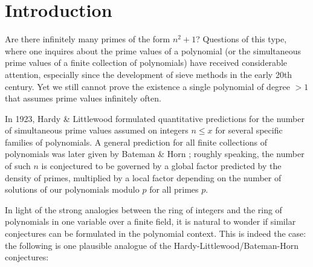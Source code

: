 \documentclass[a4paper]{compositio}
\begin{document}
\section{Introduction}

Are there infinitely many primes of the form $n^2+1$? Questions of
this type, where one inquires about the prime values of a polynomial
(or the simultaneous prime values of a finite collection of
polynomials) have received considerable attention, especially since
the development of sieve methods in the early 20th century. Yet we
still cannot prove the existence a single polynomial of degree $> 1$
that assumes prime values infinitely often.

In 1923, Hardy \& Littlewood \cite{hl23} formulated quantitative
predictions for the number of simultaneous prime values assumed on
integers $n\leq x$ for several specific families of polynomials. A
general prediction for all finite collections of polynomials was
later given by Bateman \& Horn \cite{bh}; roughly speaking, the
number of such $n$ is conjectured to be governed by a global factor
predicted by the density of primes, multiplied by a local factor
depending on the number of solutions of our polynomials modulo $p$
for all primes $p$.

In light of the strong analogies between the ring of integers and
the ring of polynomials in one variable over a finite field, it is
natural to wonder if similar conjectures can be formulated in the
polynomial context. This is indeed the case: the following is one
plausible analogue of the Hardy-Littlewood/Bateman-Horn conjectures:
\end{document}
